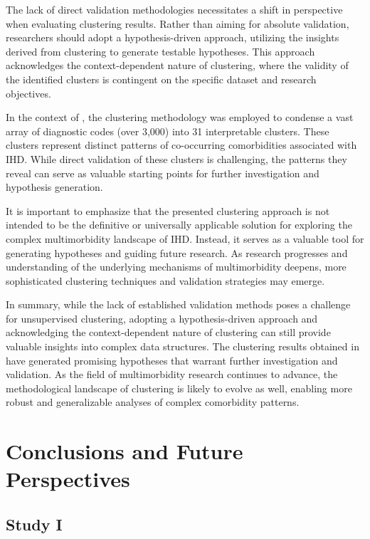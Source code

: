 The lack of direct validation methodologies necessitates a shift in perspective
when evaluating clustering results. Rather than aiming for absolute validation,
researchers should adopt a hypothesis-driven approach, utilizing the insights
derived from clustering to generate testable hypotheses. This approach
acknowledges the context-dependent nature of clustering, where the validity of
the identified clusters is contingent on the specific dataset and research
objectives.

In the context of \studyi{}, the clustering methodology was employed to
condense a vast array of diagnostic codes (over 3,000) into 31 interpretable
clusters. These clusters represent distinct patterns of co-occurring
comorbidities associated with \ac{IHD}. While direct validation of these
clusters is challenging, the patterns they reveal can serve as valuable
starting points for further investigation and hypothesis generation.

It is important to emphasize that the presented clustering approach is not
intended to be the definitive or universally applicable solution for exploring
the complex multimorbidity landscape of \ac{IHD}. Instead, it serves as a
valuable tool for generating hypotheses and guiding future research. As
research progresses and understanding of the underlying mechanisms of
multimorbidity deepens, more sophisticated clustering techniques and validation
strategies may emerge.

In summary, while the lack of established validation methods poses a challenge
for unsupervised clustering, adopting a hypothesis-driven approach and
acknowledging the context-dependent nature of clustering can still provide
valuable insights into complex data structures. The clustering results obtained
in \studyi{} have generated promising hypotheses that warrant further
investigation and validation. As the field of multimorbidity research continues
to advance, the methodological landscape of clustering is likely to evolve as
well, enabling more robust and generalizable analyses of complex comorbidity
patterns.


\chapter{Conclusions and Future Perspectives}
\label{conclusions}

\section{Study I}









